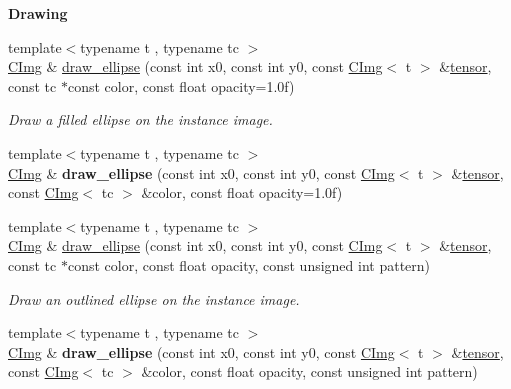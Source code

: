 \begin{Indent}{\bf Drawing}
\begin{DoxyCompactItemize}
\item 
{\footnotesize template$<$typename t , typename tc $>$ }\\\hyperlink{structcimg__library_1_1_c_img}{C\-Img} \& \hyperlink{structcimg__library_1_1_c_img_a159899f72a8a973cbf4fed731a63ff66}{draw\-\_\-ellipse} (const int x0, const int y0, const \hyperlink{structcimg__library_1_1_c_img}{C\-Img}$<$ t $>$ \&\hyperlink{structcimg__library_1_1_c_img_a40bd4344f4a7aae588ef5bfa4f8861d1}{tensor}, const tc $\ast$const color, const float opacity=1.\-0f)
\begin{DoxyCompactList}\small\item\em Draw a filled ellipse on the instance image. \end{DoxyCompactList}\item 
\hypertarget{structcimg__library_1_1_c_img_a0480e006af040e773d7350ab72f0669c}{{\footnotesize template$<$typename t , typename tc $>$ }\\\hyperlink{structcimg__library_1_1_c_img}{C\-Img} \& {\bfseries draw\-\_\-ellipse} (const int x0, const int y0, const \hyperlink{structcimg__library_1_1_c_img}{C\-Img}$<$ t $>$ \&\hyperlink{structcimg__library_1_1_c_img_a40bd4344f4a7aae588ef5bfa4f8861d1}{tensor}, const \hyperlink{structcimg__library_1_1_c_img}{C\-Img}$<$ tc $>$ \&color, const float opacity=1.\-0f)}\label{structcimg__library_1_1_c_img_a0480e006af040e773d7350ab72f0669c}

\item 
{\footnotesize template$<$typename t , typename tc $>$ }\\\hyperlink{structcimg__library_1_1_c_img}{C\-Img} \& \hyperlink{structcimg__library_1_1_c_img_a2af977c9129693a69b03dc08c08a18d1}{draw\-\_\-ellipse} (const int x0, const int y0, const \hyperlink{structcimg__library_1_1_c_img}{C\-Img}$<$ t $>$ \&\hyperlink{structcimg__library_1_1_c_img_a40bd4344f4a7aae588ef5bfa4f8861d1}{tensor}, const tc $\ast$const color, const float opacity, const unsigned int pattern)
\begin{DoxyCompactList}\small\item\em Draw an outlined ellipse on the instance image. \end{DoxyCompactList}\item 
\hypertarget{structcimg__library_1_1_c_img_a33df111a1eae1a8afffd300b37b5c629}{{\footnotesize template$<$typename t , typename tc $>$ }\\\hyperlink{structcimg__library_1_1_c_img}{C\-Img} \& {\bfseries draw\-\_\-ellipse} (const int x0, const int y0, const \hyperlink{structcimg__library_1_1_c_img}{C\-Img}$<$ t $>$ \&\hyperlink{structcimg__library_1_1_c_img_a40bd4344f4a7aae588ef5bfa4f8861d1}{tensor}, const \hyperlink{structcimg__library_1_1_c_img}{C\-Img}$<$ tc $>$ \&color, const float opacity, const unsigned int pattern)}\label{structcimg__library_1_1_c_img_a33df111a1eae1a8afffd300b37b5c629}


\end{DoxyCompactItemize}
\end{Indent}

